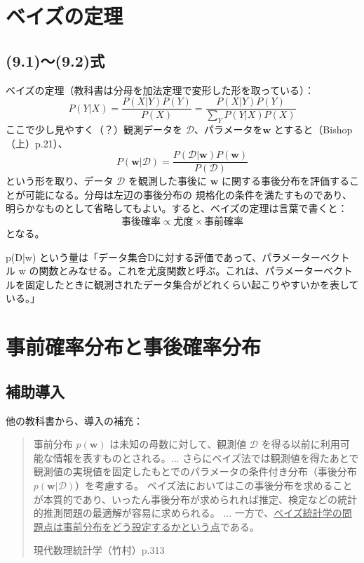 \documentclass[10pt, a4paper]{ltjsarticle}
\begin{document}
\section{ベイズの定理}

\subsection{(9.1)〜(9.2)式}
ベイズの定理（教科書は分母を加法定理で変形した形を取っている）：
\begin{equation}
  P(Y|X) = \frac{P(X|Y)P(Y)}{P(X)} = \frac{P(X|Y)P(Y)}{\sum_Y P(Y|X)P(X)}
\end{equation}
ここで少し見やすく（？）観測データを $\mathcal{D}$、パラメータを$\bm{w}$ とすると（Bishop（上）p.21）、
\begin{equation}
  P(\bm{w}|\mathcal{D}) = \frac{P(\mathcal{D}|\bm{w})P(\bm{w})}{P(\mathcal{D})}
\end{equation}
という形を取り、データ $\mathcal{D}$ を観測した事後に $\bm{w}$ に関する事後分布を評価することが可能になる。分母は左辺の事後分布の
規格化の条件を満たすものであり、明らかなものとして省略してもよい。すると、ベイズの定理は言葉で書くと：
\begin{equation}
\mathrm{事後確率} \propto \mathrm{尤度} \times 事前確率
\end{equation}
となる。

p(D|w) という量は「データ集合Dに対する評価であって、パラメーターベクトル w の関数とみなせる。これを尤度関数と呼ぶ。これは、パラメーターベクトルを固定したときに観測されたデータ集合がどれくらい起こりやすいかを表している。」



\section{事前確率分布と事後確率分布}

\subsection{補助導入}

他の教科書から、導入の補充：

\begin{quote}
事前分布 $p(\bm{w})$ は未知の母数に対して、観測値 $\mathcal{D}$ を得る以前に利用可能な情報を表すものとされる。... 
さらにベイズ法では観測値を得たあとで観測値の実現値を固定したもとでのパラメータの条件付き分布（事後分布 $p(\bm{w}|\mathcal{D})$）を考慮する。
ベイズ法においてはこの事後分布を求めることが本質的であり、いったん事後分布が求められれば推定、検定などの統計的推測問題の最適解が容易に求められる。
... 一方で、\underline{ベイズ統計学の問題点は事前分布をどう設定するかという点}である。

\hfill{現代数理統計学（竹村）p.313}
\end{quote}
\end{document}
